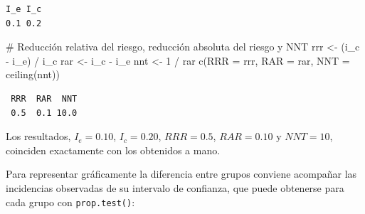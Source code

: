 \documentclass[
  spanish,
  a4paper,
]{scrreport}
\newenvironment{Shaded}{\begin{snugshade}}{\end{snugshade}}
\newcommand{\AttributeTok}[1]{\textcolor[rgb]{0.40,0.45,0.13}{#1}}
\newcommand{\CommentTok}[1]{\textcolor[rgb]{0.37,0.37,0.37}{#1}}
\newcommand{\DecValTok}[1]{\textcolor[rgb]{0.68,0.00,0.00}{#1}}
\newcommand{\FunctionTok}[1]{\textcolor[rgb]{0.28,0.35,0.67}{#1}}
\newcommand{\NormalTok}[1]{\textcolor[rgb]{0.00,0.23,0.31}{#1}}
\newcommand{\OtherTok}[1]{\textcolor[rgb]{0.00,0.23,0.31}{#1}}
\newcommand{\SpecialCharTok}[1]{\textcolor[rgb]{0.37,0.37,0.37}{#1}}
\newcommand{\StringTok}[1]{\textcolor[rgb]{0.13,0.47,0.30}{#1}}
\theoremstyle{definition}
\theoremstyle{definition}
\theoremstyle{remark}
\begin{document}
\begin{verbatim}
I_e I_c 
0.1 0.2 
\end{verbatim}

\begin{Shaded}
\begin{Highlighting}[]
\CommentTok{\# Reducción relativa del riesgo, reducción absoluta del riesgo y NNT}
\NormalTok{rrr }\OtherTok{\textless{}{-}}\NormalTok{ (i\_c }\SpecialCharTok{{-}}\NormalTok{ i\_e) }\SpecialCharTok{/}\NormalTok{ i\_c}
\NormalTok{rar }\OtherTok{\textless{}{-}}\NormalTok{ i\_c }\SpecialCharTok{{-}}\NormalTok{ i\_e}
\NormalTok{nnt }\OtherTok{\textless{}{-}} \DecValTok{1} \SpecialCharTok{/}\NormalTok{ rar}
\FunctionTok{c}\NormalTok{(}\AttributeTok{RRR =}\NormalTok{ rrr, }\AttributeTok{RAR =}\NormalTok{ rar, }\AttributeTok{NNT =} \FunctionTok{ceiling}\NormalTok{(nnt))}
\end{Highlighting}
\end{Shaded}

\begin{verbatim}
 RRR  RAR  NNT 
 0.5  0.1 10.0 
\end{verbatim}

Los resultados, \(I_e=0.10\), \(I_c=0.20\), \(RRR=0.5\), \(RAR=0.10\) y
\(NNT=10\), coinciden exactamente con los obtenidos a mano.

Para representar gráficamente la diferencia entre grupos conviene
acompañar las incidencias observadas de su intervalo de confianza, que
puede obtenerse para cada grupo con \texttt{prop.test()}:

\begin{Shaded}
\end{Shaded}
\end{document}
